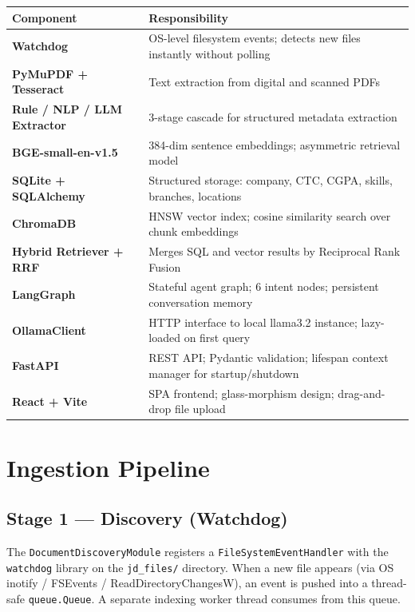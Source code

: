 \documentclass[12pt, a4paper]{article}
\begin{document}
\begin{tabularx}{\textwidth}{>{\bfseries}lX}
\toprule
Component & Responsibility \\
\midrule
Watchdog & OS-level filesystem events; detects new files instantly without polling \\
PyMuPDF + Tesseract & Text extraction from digital and scanned PDFs \\
Rule / NLP / LLM Extractor & 3-stage cascade for structured metadata extraction \\
BGE-small-en-v1.5 & 384-dim sentence embeddings; asymmetric retrieval model \\
SQLite + SQLAlchemy & Structured storage: company, CTC, CGPA, skills, branches, locations \\
ChromaDB & HNSW vector index; cosine similarity search over chunk embeddings \\
Hybrid Retriever + RRF & Merges SQL and vector results by Reciprocal Rank Fusion \\
LangGraph & Stateful agent graph; 6 intent nodes; persistent conversation memory \\
OllamaClient & HTTP interface to local llama3.2 instance; lazy-loaded on first query \\
FastAPI & REST API; Pydantic validation; lifespan context manager for startup/shutdown \\
React + Vite & SPA frontend; glass-morphism design; drag-and-drop file upload \\
\bottomrule
\end{tabularx}

\section{Ingestion Pipeline}

\subsection{Stage 1 --- Discovery (Watchdog)}

The \texttt{DocumentDiscoveryModule} registers a \texttt{FileSystemEventHandler} with the \texttt{watchdog} library on the \texttt{jd\_files/} directory. When a new file appears (via OS inotify / FSEvents / ReadDirectoryChangesW), an event is pushed into a thread-safe \texttt{queue.Queue}. A separate indexing worker thread consumes from this queue.
\end{document}
